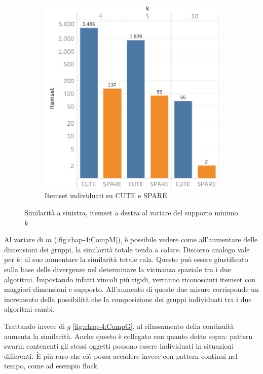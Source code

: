 \begin{figure}
\begin{subfigure}{.5\textwidth}
   \includegraphics[scale=0.6]{res/fig/sec-4/scalability/ComparisonKCUTESPARE.pdf}
  \caption{Itemset individuati su CUTE e SPARE}%
  \end{subfigure}%
  \caption{Similarità a sinistra, itemset a destra al variare del supporto minimo \(k\)}%
  \label{fig:chap-4:CompK}
\end{figure}


Al variare di \(m\) (\cref{fig:chap-4:CompM}), è possibile vedere come all'aumentare delle dimensioni dei gruppi, la similarità totale tenda a calare.
Discorso analogo vale per \(k\): al suo aumentare la similarità totale cala.
Questo può essere giustificato sulla base delle divergenze nel determinare la vicinanza spaziale tra i due algoritmi.
Impostando infatti vincoli più rigidi, verranno riconosciuti itemset con maggiori dimensioni e supporto.
All'aumento di queste due misure corrisponde un incremento della possibilità che la composizione dei gruppi individuati tra i due algoritmi cambi.

Trattando invece di \(g\) \cref{fig:chap-4:CompG}, al rilassamento della continuità aumenta la similarità.
Anche questo è collegato con quanto detto sopra: pattern swarm contenenti gli stessi oggetti possono essere individuati in situazioni differenti.
È più raro che ciò possa accadere invece con pattern continui nel tempo, come ad esempio flock.

